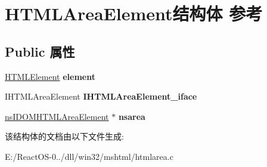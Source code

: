 \hypertarget{struct_h_t_m_l_area_element}{}\section{H\+T\+M\+L\+Area\+Element结构体 参考}
\label{struct_h_t_m_l_area_element}
\subsection*{Public 属性}
\begin{DoxyCompactItemize}
\item 
\mbox{\label{struct_h_t_m_l_area_element_a8b31d34f97afcf697db53d2a7c9c614d}} 
\hyperlink{struct_h_t_m_l_element}{H\+T\+M\+L\+Element} {\bfseries element}
\item 
\mbox{\label{struct_h_t_m_l_area_element_ad11c4a900154acbf6a74d10f915588ef}} 
I\+H\+T\+M\+L\+Area\+Element {\bfseries I\+H\+T\+M\+L\+Area\+Element\+\_\+iface}
\item 
\mbox{\label{struct_h_t_m_l_area_element_accf570f58e5b9d4854d71d5f8960b97c}} 
\hyperlink{interfacens_i_d_o_m_h_t_m_l_area_element}{ns\+I\+D\+O\+M\+H\+T\+M\+L\+Area\+Element} $\ast$ {\bfseries nsarea}
\end{DoxyCompactItemize}


该结构体的文档由以下文件生成\+:\begin{DoxyCompactItemize}
\item 
E\+:/\+React\+O\+S-\/0../dll/win32/mshtml/htmlarea.\+c\end{DoxyCompactItemize}
